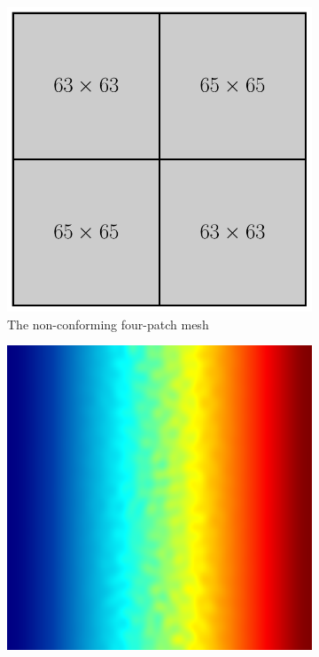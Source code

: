 \begin{figure}[ht]
	\center
	\captionsetup[subfigure]{labelformat=empty}
	\begin{subfigure}[t]{.3\linewidth}
		\center
		\includegraphics[scale=.431]{phase_field_domain_linear}
		\vspace{-.4\baselineskip}
		\caption{The non-conforming four-patch mesh}
	\end{subfigure}
	\begin{subfigure}[t]{.3\linewidth}
		\center
		\includegraphics[scale=.25]{linear_ch_1_2}

\end{subfigure}
\end{figure}
